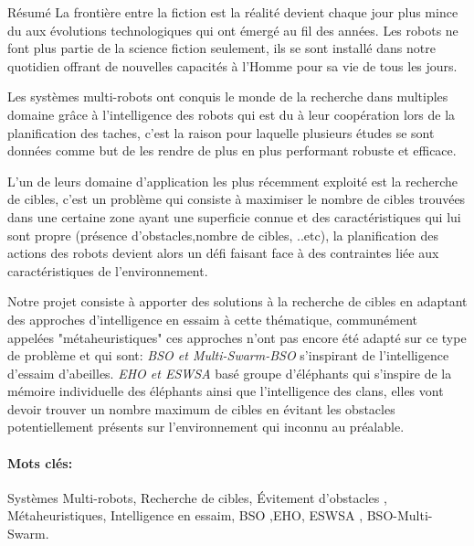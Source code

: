 
\begin{poliabstract}{Résumé}
	La frontière entre la fiction est la réalité devient chaque jour plus mince du aux évolutions technologiques qui ont émergé au fil des années. Les robots ne font plus partie de la science fiction seulement, ils se sont installé dans notre quotidien offrant de nouvelles capacités à l’Homme pour sa vie de tous les jours. 
	
	
	Les systèmes multi-robots ont conquis le monde de la recherche dans multiples domaine grâce à l'intelligence des robots qui est du à leur coopération lors de la planification des taches, c'est la raison pour laquelle plusieurs études se sont données comme but de les rendre de plus en plus performant robuste et efficace.
	
	L'un de leurs domaine d'application les plus récemment exploité est la recherche de cibles, c'est un problème qui consiste à maximiser le nombre de cibles trouvées dans une certaine zone ayant une superficie connue et des caractéristiques qui lui sont propre (présence d'obstacles,nombre de cibles, ..etc), la planification des actions des robots devient alors un défi faisant face à des contraintes liée aux caractéristiques de l'environnement.
	
	Notre projet consiste à apporter des solutions à la recherche de cibles  en adaptant des approches d'intelligence en essaim à cette thématique, communément appelées "métaheuristiques" ces approches n'ont pas encore été adapté sur ce type de problème et qui sont:  \textit{BSO et Multi-Swarm-BSO} s'inspirant de l'intelligence d'essaim d'abeilles. 
	\textit{EHO et ESWSA} basé groupe d'éléphants qui s'inspire de la mémoire individuelle des éléphants ainsi que l'intelligence des clans, elles vont devoir  trouver un nombre maximum de cibles en évitant les obstacles potentiellement présents sur l'environnement qui inconnu au préalable.
	\paragraph*{Mots clés:}
	Systèmes Multi-robots, Recherche de cibles, Évitement d'obstacles , Métaheuristiques, Intelligence en essaim, BSO ,EHO, ESWSA , BSO-Multi-Swarm.
	
\end{poliabstract}

